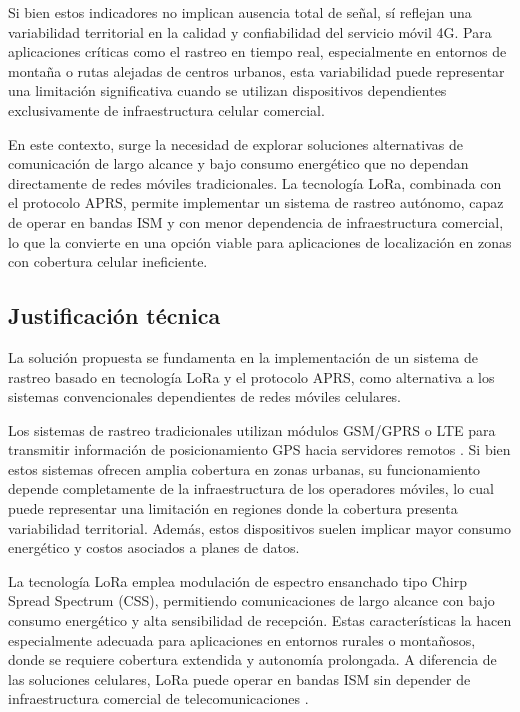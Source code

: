 \documentclass[conference]{IEEEtran}
\begin{document}
Si bien estos indicadores no implican ausencia total de señal, sí reflejan una variabilidad territorial en la calidad y confiabilidad del servicio móvil 4G. Para aplicaciones críticas como el rastreo en tiempo real, especialmente en entornos de montaña o rutas alejadas de centros urbanos, esta variabilidad puede representar una limitación significativa cuando se utilizan dispositivos dependientes exclusivamente de infraestructura celular comercial.

En este contexto, surge la necesidad de explorar soluciones alternativas de comunicación de largo alcance y bajo consumo energético que no dependan directamente de redes móviles tradicionales. La tecnología LoRa, combinada con el protocolo APRS, permite implementar un sistema de rastreo autónomo, capaz de operar en bandas ISM y con menor dependencia de infraestructura comercial, lo que la convierte en una opción viable para aplicaciones de localización en zonas con cobertura celular ineficiente.

\subsection{Justificación técnica}

La solución propuesta se fundamenta en la implementación de un sistema de rastreo basado en tecnología LoRa y el protocolo APRS, como alternativa a los sistemas convencionales dependientes de redes móviles celulares.

Los sistemas de rastreo tradicionales utilizan módulos GSM/GPRS o LTE para transmitir información de posicionamiento GPS hacia servidores remotos \cite{GPS}. Si bien estos sistemas ofrecen amplia cobertura en zonas urbanas, su funcionamiento depende completamente de la infraestructura de los operadores móviles, lo cual puede representar una limitación en regiones donde la cobertura presenta variabilidad territorial. Además, estos dispositivos suelen implicar mayor consumo energético y costos asociados a planes de datos.

La tecnología LoRa emplea modulación de espectro ensanchado tipo Chirp Spread Spectrum (CSS), permitiendo comunicaciones de largo alcance con bajo consumo energético y alta sensibilidad de recepción. Estas características la hacen especialmente adecuada para aplicaciones en entornos rurales o montañosos, donde se requiere cobertura extendida y autonomía prolongada. A diferencia de las soluciones celulares, LoRa puede operar en bandas ISM sin depender de infraestructura comercial de telecomunicaciones \cite{ISM}.
\end{document}
